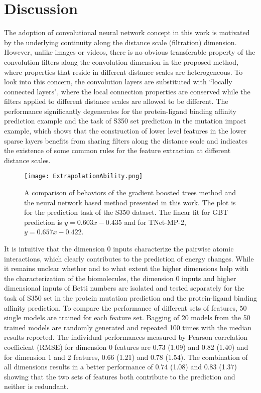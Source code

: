 \documentclass[10pt]{article}
\begin{document}
\section{Discussion}
 
The adoption of convolutional neural network concept in this work is motivated by the underlying continuity along the distance scale (filtration) dimension. However, unlike images or videos, there is no obvious transferable property of the convolution filters along the convolution dimension in the proposed method, where properties that reside in different distance scales are heterogeneous. To look into this concern, the convolution layers are substituted with ``locally connected layers", where the local connection properties are conserved while the filters applied to different distance scales are allowed to be different. The performance significantly degenerates for the protein-ligand binding affinity prediction example and the task of S350 set prediction in the mutation impact example, which shows that the construction of lower level features in the lower sparse layers benefits from sharing filters along the distance scale and indicates the existence of some common rules for the feature extraction at different distance scales. 

\begin{figure}[ht]
\begin{center}
\texttt{[image: ExtrapolationAbility.png]}
\caption{A comparison of behaviors of the gradient boosted trees method \cite{ZXCang:2017a} and the neural network based method presented in this work. The plot is for the prediction task of the S350 dataset. The linear fit for GBT prediction is $y = 0.603x - 0.435$ and for TNet-MP-2, $y = 0.657x-0.422$.}
\label{fig:ExtrapolationAbility}
\end{center}
\end{figure}

It is intuitive that the dimension $0$ inputs characterize the pairwise atomic interactions, which clearly contributes to the prediction of energy changes. While it remains unclear whether and to what extent the higher dimensions help with the characterization of the biomolecules, the dimension $0$ inputs and  higher dimensional inputs of Betti numbers  are isolated and tested separately for the task of S350 set in the protein mutation prediction and the protein-ligand binding affinity prediction. To compare the performance of different sets of features, 50 single models are trained for each feature set. Bagging of 20 models from the 50 trained models are randomly generated and repeated 100 times with the median results reported. The individual performances measured by Pearson correlation coefficient (RMSE) for dimension $0$ features are 0.73 (1.09) and 0.82 (1.40) and for dimension $1$ and $2$ features, 0.66 (1.21) and 0.78 (1.54). The combination of all dimensions results in a better performance of 0.74 (1.08) and 0.83 (1.37) showing that the two sets of features both contribute to the prediction and neither is redundant.
\end{document}
